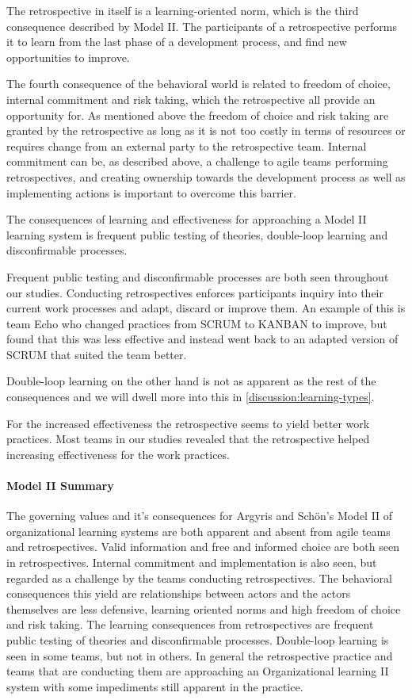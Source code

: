 The retrospective in itself is a learning-oriented norm, which is the third consequence described by Model II. The participants of a retrospective performs it to learn from the last phase of a development process, and find new opportunities to improve. 

The fourth consequence of the behavioral world is related to freedom of choice, internal commitment and risk taking, which the retrospective all provide an opportunity for. As mentioned above the freedom of choice and risk taking are granted by the retrospective as long as it is not too costly in terms of resources or requires change from an external party to the retrospective team. Internal commitment can be, as described above, a challenge to agile teams performing retrospectives, and creating ownership towards the development process as well as implementing actions is important to overcome this barrier.  

The consequences of learning and effectiveness for approaching a Model II learning system is frequent public testing of theories, double-loop learning and disconfirmable processes. 

Frequent public testing and disconfirmable processes are both seen throughout our studies. Conducting retrospectives enforces participants inquiry into their current work processes and adapt, discard or improve them. An example of this is team Echo who changed practices from SCRUM to KANBAN to improve, but found that this was less effective and instead went back to an adapted version of SCRUM that suited the team better. 

Double-loop learning on the other hand is not as apparent as the rest of the consequences and we will dwell more into this in \autoref{discussion:learning-types}. 

For the increased effectiveness the retrospective seems to yield better work practices. Most teams in our studies revealed that the retrospective helped increasing effectiveness for the work practices. 

\paragraph{Model II Summary}
The governing values and it's consequences for Argyris and Schön's Model II of organizational learning systems are both apparent and absent from agile teams and retrospectives. Valid information and free and informed choice are both seen in retrospectives. Internal commitment and implementation is also seen, but regarded as a challenge by the teams conducting retrospectives. The behavioral consequences this yield are relationships between actors and the actors themselves are less defensive, learning oriented norms and high freedom of choice and risk taking. The learning consequences from retrospectives are frequent public testing of theories and disconfirmable processes. Double-loop learning is seen in some teams, but not in others. In general the retrospective practice and teams that are conducting them are approaching an Organizational learning II system with some impediments still apparent in the practice.

